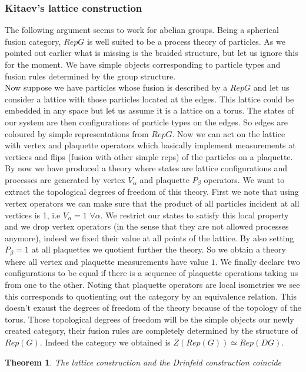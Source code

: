 \documentclass{article}
\newtheorem{theorem}{Theorem}
\begin{document}
\subsubsection{Kitaev's lattice construction}
The following argument seems to work for abelian groups.
Being a spherical fusion category, $RepG$ is well suited to be a process theory of particles. As we pointed out earlier what is missing is the braided structure, but let us ignore this for the moment. We have simple objects corresponding to particle types and fusion rules determined by the group structure.\\
Now suppose we have particles whose fusion is described by a $RepG$ and let us consider a lattice with those particles located at the edges. This lattice could be embedded in any space but let us assume it is a lattice on a torus. The states of our system are then configurations of particle types on the edges. So edges are coloured by simple representations from $RepG$. Now we can act on the lattice with vertex and plaquette operators which basically implement measurements at vertices and flips (fusion with other simple reps) of the particles on a plaquette. By now we have produced a theory where states are lattice configurations and processes are generated by vertex $V_\alpha$ and plaquette $P_\beta$ operators. We want to extract the topological degrees of freedom of this theory. First we note that using vertex operators we can make sure that the product of all particles incident at all vertices is 1, i.e $V_\alpha=1$ $\forall \alpha$. We restrict our states to satisfy this local property and we drop vertex operators (in the sense that they are not allowed processes anymore), indeed we fixed their value at all points of the lattice. By also setting $P_\beta =1$ at all plaquettes we quotient further the theory. So we obtain a theory where all vertex and plaquette measurements have value $1$. We finally declare two configurations to be equal if there is a sequence of plaquette operations taking us from one to the other. Noting that plaquette operators are local isometries we see this corresponds to quotienting out the category by an equivalence relation. This doesn't exaust the degrees of freedom of the theory because of the topology of the torus. Those topological degrees of freedom will be the simple objects our newly created category, their fusion rules are completely determined by the structure of $Rep(G)$. Indeed the category we obtained is $Z(Rep(G)) \simeq Rep(DG)$.

\begin{theorem}
The lattice construction and the Drinfeld construction coincide
\end{theorem}
\end{document}
